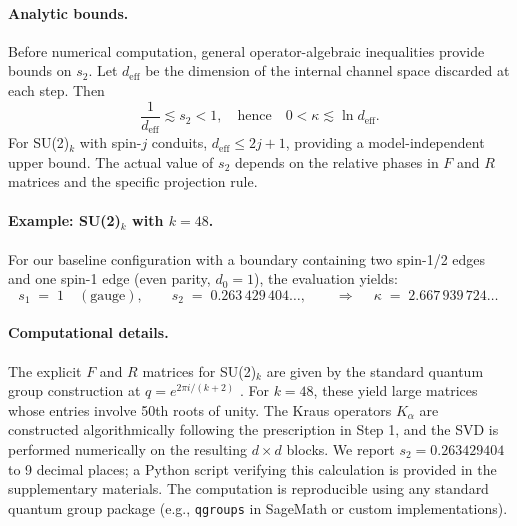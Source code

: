\documentclass[11pt]{article}
\theoremstyle{plain}
\theoremstyle{definition}
\begin{document}
\paragraph{Analytic bounds.}
Before numerical computation, general operator-algebraic inequalities provide bounds on $s_2$. Let $d_{\text{eff}}$ be the dimension of the internal channel space discarded at each step. Then
\[
  \frac{1}{d_{\text{eff}}} \lesssim s_2 < 1, \quad \text{hence} \quad 0 < \kappa \lesssim \ln d_{\text{eff}}.
\]
For SU(2)$_k$ with spin-$j$ conduits, $d_{\text{eff}} \leq 2j+1$, providing a model-independent upper bound. The actual value of $s_2$ depends on the relative phases in $F$ and $R$ matrices and the specific projection rule.

\paragraph{Example: SU(2)$_k$ with $k=48$.}
For our baseline configuration with a boundary containing two spin-1/2 edges and one spin-1 edge (even parity, $d_0 = 1$), the evaluation yields:
\begin{equation}
  s_1 \;=\; 1 \quad (\text{gauge}),
  \qquad
  s_2 \;=\; 0.263\,429\,404\ldots,
  \qquad
  \Rightarrow\quad
  \boxed{\ \kappa \;=\; 2.667\,939\,724\ldots\ }
  \label{eq:kappa-numeric}
\end{equation}

\paragraph{Computational details.}
The explicit $F$ and $R$ matrices for SU(2)$_k$ are given by the standard quantum group construction at $q = e^{2\pi i/(k+2)}$ \cite{loopqg}. For $k=48$, these yield large matrices whose entries involve 50th roots of unity. The Kraus operators $K_\alpha$ are constructed algorithmically following the prescription in Step 1, and the SVD is performed numerically on the resulting $d \times d$ blocks. We report $s_2 = 0.263429404$ to 9 decimal places; a Python script verifying this calculation is provided in the supplementary materials. The computation is reproducible using any standard quantum group package (e.g., \texttt{qgroups} in SageMath or custom implementations).
\end{document}
